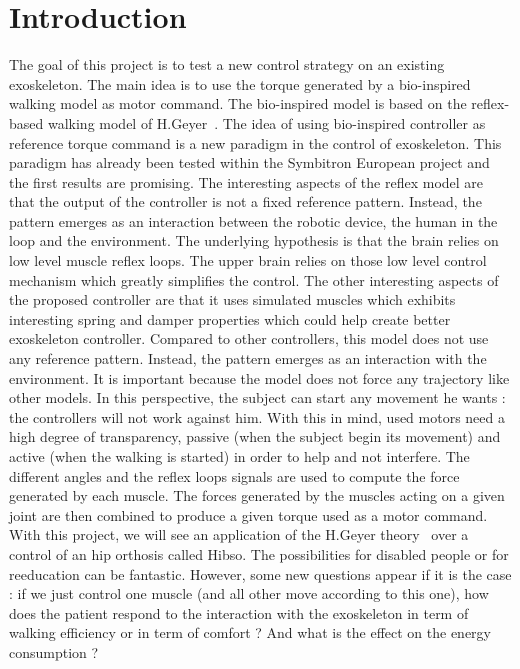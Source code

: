 \documentclass[a4paper,12pt]{article}
\begin{document}
\newpage
\tableofcontents
\newpage


\section{Introduction}
\medbreak
The goal of this project is to test a new control strategy on an existing exoskeleton. The main idea is to use the torque generated by a bio-inspired walking model as motor command. The bio-inspired model is based on the reflex-based walking model of H.Geyer~\cite{geyer2010muscle}. The idea of using bio-inspired controller as reference torque command is a new paradigm in the control of exoskeleton. This paradigm has already been tested within the Symbitron European project and the first results are promising. The interesting aspects of the reflex model are that the output of the controller is not a fixed reference pattern. Instead, the pattern emerges as an interaction between the robotic device, the human in the loop and the environment.
\medbreak
The underlying hypothesis is that the brain relies on low level muscle reflex loops. The upper brain relies on those low level control mechanism which greatly simplifies the control. The other interesting aspects of the proposed controller are that it uses simulated muscles which exhibits interesting spring and damper properties which could help create better exoskeleton controller.
\medbreak
Compared to other controllers, this model does not use any reference pattern. Instead, the pattern emerges as an interaction with the environment. It is important because the model does not force any trajectory like other models. In this perspective, the subject can start any movement he wants : the controllers will not work against him. With this in mind, used motors need a high degree of transparency, passive (when the subject begin its movement) and active (when the walking is started) in order to help and not interfere. The different angles and the reflex loops signals are used to compute the force generated by each muscle. The forces generated by the muscles acting on a given joint are then combined to produce a given torque used as a motor command.
\medbreak
With this project, we will see an application of the H.Geyer theory~\cite{geyer2010muscle} over a control of an hip orthosis called Hibso. The possibilities for disabled people or for reeducation can be fantastic. However, some new questions appear if it is the case : if we just control one muscle (and all other move according to this one), how does the patient respond to the interaction with the exoskeleton in term of walking efficiency or in term of comfort ? And what is the effect on the energy consumption ?
\end{document}

